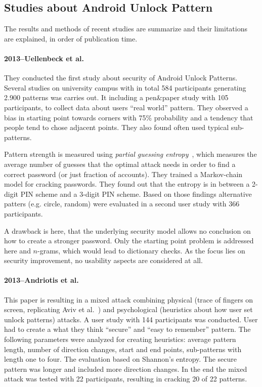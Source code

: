 \documentclass[twocolumn, a4paper, 10pt]{article}
\begin{document}
\subsection{Studies about Android Unlock Pattern}
\label{sec:relatedstudies}

The results and methods of recent studies are summarize and their limitations are explained, in order of publication time.

\paragraph{2013--Uellenbeck et al. ~\cite{Uellenbeck:2013:QSG:2508859.2516700}} They conducted the first study about security of Android Unlock Patterns. Several studies on university campus with in total 584 participants generating 2.900 patterns was carries out. It including a pen\&paper study with 105 participants, to collect data about users ``real world'' pattern. They observed a bias in starting point towards corners with 75\% probability and a tendency that people tend to chose adjacent points. They also found often used typical sub-patterns.

Pattern strength is measured using \textit{partial guessing entropy}~\cite{bonneau2012science}, which measures the average number of guesses that the optimal attack needs in order to find a correct password (or just fraction of accounts). They trained a Markov-chain model for cracking passwords. They found out that the entropy is in between a 2-digit PIN scheme and a 3-digit PIN scheme. Based on those findings alternative patters (e.g. circle, random) were evaluated in a second user study with 366 participants.

A drawback is here, that the underlying security model allows no conclusion on how to create a stronger password. Only the starting point problem is addressed here and $n$-grams, which would lead to dictionary checks. As the focus lies on security improvement, no usability aspects are considered at all.


\paragraph{2013--Andriotis et al.~\cite{Andriotis:2013:PSS:2462096.2462098}} 
This paper is resulting in a mixed attack combining physical (trace of fingers on screen, replicating Aviv et al.~\cite{Aviv:2010:SAS:1925004.1925009}) and psychological (heuristics about how user set unlock patterns) attacks. A user study with 144 participants was conducted. User had to create a what they think ``secure'' and ``easy to remember'' pattern. The following parameters were analyzed for creating heuristics: average pattern length, number of direction changes, start and end points, sub-patterns with length one to four. The evaluation based on Shannon's entropy. The secure pattern was longer and included more direction changes. In the end the mixed attack was tested with 22 participants, resulting in cracking 20 of 22 patterns.
\end{document}
